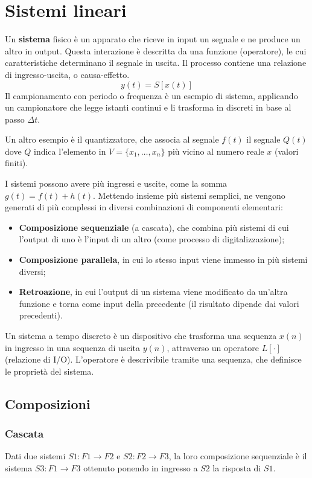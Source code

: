 \section{Sistemi lineari}
Un \textbf{sistema} fisico è un apparato che riceve in input un segnale e ne produce un altro in output. Questa interazione è descritta da una funzione (operatore), le cui caratteristiche determinano il segnale in uscita. Il processo contiene una relazione di ingresso-uscita, o causa-effetto.
$$y(t) = S[x(t)]$$
Il campionamento con periodo o frequenza è un esempio di sistema, applicando un campionatore che legge istanti continui e li trasforma in discreti in base al passo $\Delta t$. 

Un altro esempio è il quantizzatore, che associa al segnale $f(t)$ il segnale $Q(t)$ dove $Q$ indica l'elemento in $V = \{x_1, \dots, x_n\}$ più vicino al numero reale $x$ (valori finiti).

I sistemi possono avere più ingressi e uscite, come la somma $g(t) = f(t) + h(t)$. Mettendo insieme più sistemi semplici, ne vengono generati di più complessi in diversi combinazioni di componenti elementari:
\begin{itemize}
	\item \textbf{Composizione sequenziale} (a cascata), che combina più sistemi di cui l'output di uno è l'input di un altro (come processo di digitalizzazione);
	\item \textbf{Composizione parallela}, in cui lo stesso input viene immesso in più sistemi diversi;
	\item \textbf{Retroazione}, in cui l'output di un sistema viene modificato da un'altra funzione e torna come input della precedente (il risultato dipende dai valori precedenti).
\end{itemize}

Un sistema a tempo discreto è un dispositivo che trasforma una sequenza $x(n)$ in ingresso in una sequenza di uscita $y(n)$, attraverso un operatore $L[\cdot]$ (relazione di I/O). L'operatore è descrivibile tramite una sequenza, che definisce le proprietà del sistema.

\subsection{Composizioni}
\subsubsection{Cascata}
Dati due sistemi $S1 : F1 \rightarrow F2$ e $S2 : F2 \rightarrow F3$, la loro composizione sequenziale è il sistema $S3 : F1 \rightarrow F3$ ottenuto ponendo in ingresso a $S2$ la risposta di $S1$.

